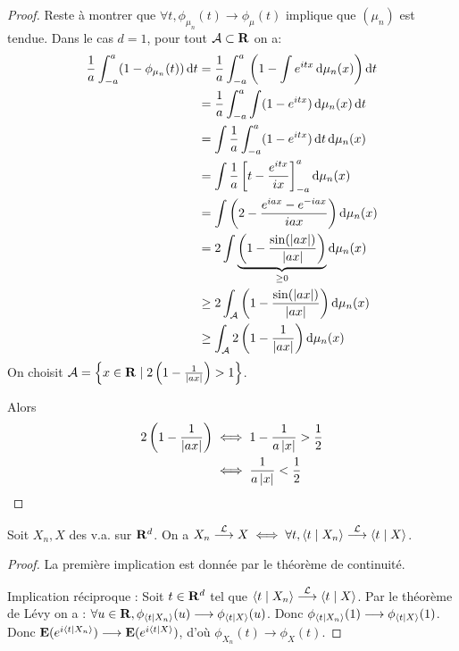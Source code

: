 \begin{proof}
		Reste à montrer que $\forall t, \phi_{\mu_n}(t) \longrightarrow \phi_\mu(t)$ implique que $(\mu_n)$ est tendue.
		Dans le cas $d = 1$, pour tout $\mathcal{A} \subset \mathbf{R}$ on a:
		\begin{align*}
		\frac{1}{a} \int_{-a}^a (1 - \phi_{\mu_n}(t)) \mathop{}\mathopen{}\mathrm{d} t
			& = \frac{1}{a} \int_{-a}^a \left(1 - \int e^{itx} \mathop{}\mathopen{}\mathrm{d} \mu_n(x) \right) \mathop{}\mathopen{}\mathrm{d} t \\
			& = \frac{1}{a} \int_{-a}^a \int (1 - e^{itx}) \mathop{}\mathopen{}\mathrm{d} \mu_n(x) \mathop{}\mathopen{}\mathrm{d} t \\
			& = \int \frac{1}{a} \int_{-a}^a (1 - e^{itx}) \mathop{}\mathopen{}\mathrm{d} t \mathop{}\mathopen{}\mathrm{d} \mu_n(x) \\
			& = \int \frac{1}{a} \left[ t - \frac{e^{itx}}{ix} \right]_{-a}^a \mathop{}\mathopen{}\mathrm{d} \mu_n(x) \\
			& = \int \left( 2 - \frac{e^{iax} - e^{-iax}}{iax} \right) \mathop{}\mathopen{}\mathrm{d} \mu_n(x) \\
			& = 2 \int \underset{\geq 0}{\underbrace{ \left( 1 - \frac{\sin(\left\lvert ax\right\rvert)}{\left\lvert ax\right\rvert} \right) }} \mathop{}\mathopen{}\mathrm{d} \mu_n(x) \\
			& \geq 2 \int_{\mathcal{A}} \left( 1 - \frac{\sin(\left\lvert ax\right\rvert)}{\left\lvert ax\right\rvert} \right) \mathop{}\mathopen{}\mathrm{d} \mu_n(x) \\
			& \geq \int_{\mathcal{A}} 2 \left( 1 - \frac{1}{\left\lvert ax\right\rvert} \right) \mathop{}\mathopen{}\mathrm{d} \mu_n(x)
		\end{align*}
		On choisit $\mathcal{A} = \left\{ x \in \mathbf{R} \mid 2 \left( 1 - \frac{1}{\left\lvert ax\right\rvert} \right) > 1 \right\}$.
		
		Alors
		\begin{align*}
		2 \left( 1 - \frac{1}{\left\lvert ax\right\rvert} \right)
			& \iff 1 - \frac{1}{a \left\lvert x\right\rvert} > \frac{1}{2} \\
			& \iff \frac{1}{a \left\lvert x\right\rvert} < \frac{1}{2}
		\end{align*}
	\end{proof}

	\begin{thm}
		Soit $X_n, X$ des v.a. sur $\mathbf{R}^d$.
		On a $X_n \overset{\mathcal{L}}{\longrightarrow} X \iff \forall t, \left\langle t \mid X_n \right\rangle \overset{\mathcal{L}}{\longrightarrow} \left\langle t \mid X \right\rangle$.
	\end{thm}
	
	\begin{proof}
		La première implication est donnée par le théorème de continuité.
		
		Implication réciproque :
		Soit $t \in \mathbf{R}^d$ tel que $\left\langle t \mid X_n \right\rangle \overset{\mathcal{L}}{\longrightarrow} \left\langle t \mid X \right\rangle$.
		Par le théorème de Lévy on a : $\forall u \in \mathbf{R}, \phi_{\left\langle t \mid X_n \right\rangle}(u) \longrightarrow \phi_{\left\langle t \mid X \right\rangle}(u)$.
		Donc $\phi_{\left\langle t \mid X_n \right\rangle}(1) \longrightarrow \phi_{\left\langle t \mid X \right\rangle}(1)$.
		Donc $\mathbf{E}(e^{i \left\langle t \mid X_n \right\rangle}) \longrightarrow \mathbf{E}(e^{i \left\langle t \mid X \right\rangle})$, d'où $\phi_{X_n}(t) \longrightarrow \phi_X(t)$.
	\end{proof}


